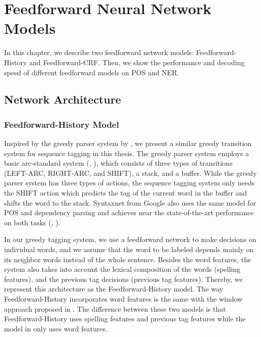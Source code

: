 
\chapter{Feedforward Neural Network Models}

In this chapter, we describe two feedforward network models: Feedforward-History and Feedforward-CRF. Then, we show the performance and decoding speed of different feedforward models on POS and NER. 

\section{Network Architecture}

\subsection{Feedforward-History Model}

Inspired by the greedy parser system by \cite{chen2014fast}, we present a similar greedy transition system for sequence tagging in this thesis. The greedy parser system employs a basic arc-standard system (\citeauthor{nivre2004deterministic}, \citeyear{nivre2004deterministic}), which consists of three types of transitions (LEFT-ARC, RIGHT-ARC, and SHIFT), a stack, and a buffer. While the greedy parser system has three types of actions, the sequence tagging system only needs the SHIFT action which predicts the tag of the current word in the buffer and shifts the word to the stack.  Syntaxnet from Google also uses the same model for POS and dependency parsing and achieves near the state-of-the-art performance on both tasks (\citeauthor{alberti2017syntaxnet}, \citeyear{alberti2017syntaxnet}).

In our greedy tagging system, we use a feedforward network to make decisions on individual words, and we assume that the word to be labeled depends mainly on its neighbor words instead of the whole sentence. Besides the word features, the system also takes into account the lexical composition of the words (spelling features), and the previous tag decisions (previous tag features). Thereby, we represent this architecture as the Feedforward-History model. The way Feedforward-History incorporates word features is the same with the window approach proposed in \cite{collobert2011natural}. The difference between these two models is that Feedforward-History uses spelling features and previous tag features while the model in \cite{collobert2011natural} only uses word features.

